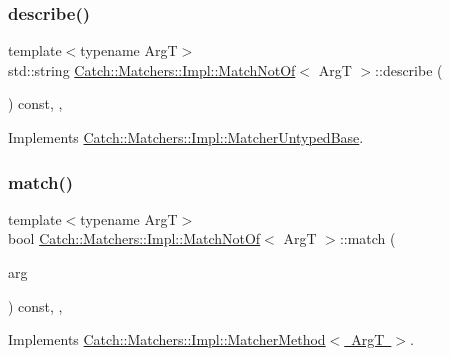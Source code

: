\subsubsection{\texorpdfstring{describe()}{describe()}}
{\footnotesize\ttfamily template$<$typename ArgT$>$ \\
std\+::string \mbox{\hyperlink{struct_catch_1_1_matchers_1_1_impl_1_1_match_not_of}{Catch\+::\+Matchers\+::\+Impl\+::\+Match\+Not\+Of}}$<$ ArgT $>$\+::describe (\begin{DoxyParamCaption}{ }\end{DoxyParamCaption}) const\hspace{0.3cm}{\ttfamily [inline]}, {\ttfamily [override]}, {\ttfamily [virtual]}}



Implements \mbox{\hyperlink{class_catch_1_1_matchers_1_1_impl_1_1_matcher_untyped_base_a91d3a907dbfcbb596077df24f6e11fe2}{Catch\+::\+Matchers\+::\+Impl\+::\+Matcher\+Untyped\+Base}}.

\mbox{\label{struct_catch_1_1_matchers_1_1_impl_1_1_match_not_of_a181d693c0258e582d80dc6117a1f2b66}} 
\subsubsection{\texorpdfstring{match()}{match()}}
{\footnotesize\ttfamily template$<$typename ArgT$>$ \\
bool \mbox{\hyperlink{struct_catch_1_1_matchers_1_1_impl_1_1_match_not_of}{Catch\+::\+Matchers\+::\+Impl\+::\+Match\+Not\+Of}}$<$ ArgT $>$\+::match (\begin{DoxyParamCaption}\item[{ArgT const \&}]{arg }\end{DoxyParamCaption}) const\hspace{0.3cm}{\ttfamily [inline]}, {\ttfamily [override]}, {\ttfamily [virtual]}}



Implements \mbox{\hyperlink{struct_catch_1_1_matchers_1_1_impl_1_1_matcher_method_ae0920ff9e817acf08e1bb0cbcb044e30}{Catch\+::\+Matchers\+::\+Impl\+::\+Matcher\+Method$<$ Arg\+T $>$}}.



